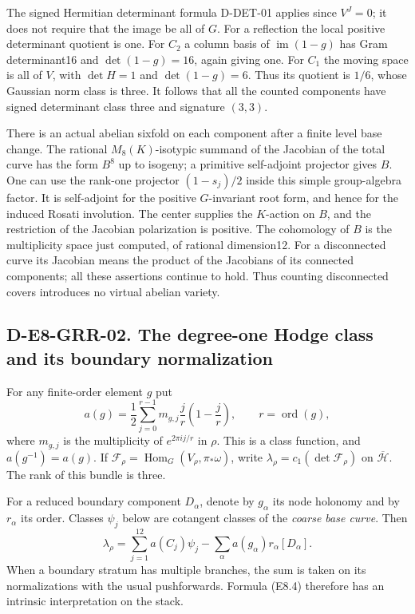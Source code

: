 The signed Hermitian determinant formula D-DET-01 applies since
$V^J=0$; it does not require that the image be all of $G$.
For a reflection the local positive determinant quotient is one.
For $C_2$ a column basis of $\operatorname{im}(1-g)$ has Gram
determinant16 and $\det(1-g)=16$, again giving one.  For $C_1$ the
moving space is all of $V$, with $\det H=1$ and $\det(1-g)=6$.
Thus its quotient is $1/6$, whose Gaussian norm class is three.
It follows that all the counted components have signed determinant
class three and signature $(3,3)$.

There is an actual abelian sixfold on each component after a finite
level base change.  The rational $M_8(K)$-isotypic summand of the
Jacobian of the total curve has the form $B^8$ up to isogeny; a
primitive self-adjoint projector gives $B$.  One can use the
rank-one projector $(1-s_j)/2$ inside this simple group-algebra
factor.  It is self-adjoint for the positive $G$-invariant root form,
and hence for the induced Rosati involution.  The center supplies
the $K$-action on $B$, and the restriction of the Jacobian
polarization is positive.  The cohomology of $B$ is the multiplicity
space just computed, of rational dimension12.  For a disconnected
curve its Jacobian means the product of the Jacobians of its connected
components; all these assertions continue to hold.  Thus counting
disconnected covers introduces no virtual abelian variety.

\subsection*{D-E8-GRR-02. The degree-one Hodge class and its boundary normalization}

For any finite-order element $g$ put
\[
 a(g)=\frac12\sum_{j=0}^{r-1}m_{g,j}\frac jr\left(1-\frac jr\right),
 \qquad r=\operatorname{ord}(g),                               \tag{E8.3}
\]
where $m_{g,j}$ is the multiplicity of $e^{2\pi i j/r}$ in $\rho$.
This is a class function, and $a(g^{-1})=a(g)$.  If
$\mathcal F_\rho=\operatorname{Hom}_G(V_\rho,\pi_*\omega)$, write
$\lambda_\rho=c_1(\det\mathcal F_\rho)$ on
$\overline{\mathcal H}$.  The rank of this bundle is three.

For a reduced boundary component $D_\alpha$, denote by $g_\alpha$
its node holonomy and by $r_\alpha$ its order.  Classes $\psi_j$
below are cotangent classes of the \emph{coarse base curve}.
Then
\[
 \boxed{\lambda_\rho=\sum_{j=1}^{12}a(C_j)\psi_j
          -\sum_\alpha a(g_\alpha)r_\alpha[D_\alpha].}          \tag{E8.4}
\]
When a boundary stratum has multiple branches, the sum is taken on
its normalizations with the usual pushforwards.  Formula (E8.4)
therefore has an intrinsic interpretation on the stack.

